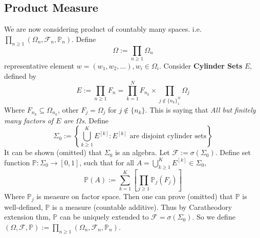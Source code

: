 \documentclass[a4paper,12pt,twoside]{book}
\begin{document}
\subsection{Product Measure}
We are now considering product of countably many spaces. i.e. $\prod_{n\geq 1}(\Omega_n, \mathcal{F}_n, \mathbb{P}_n)$.\newline
Define 
$$\Omega:=\prod_{n\geq 1}\Omega_n$$
representative element $w = (w_1, w_2,...), w_i \in \Omega_i$.\newline
Consider \textbf{Cylinder Sets} $E$, defined by
\begin{equation}
	E:=\prod_{n\geq 1}F_n= \prod_{k=1}^N F_{n_k} \times \prod_{j\notin\{n_k\}_1^N}\Omega_j
\end{equation}
Where $F_{n_k}\subseteq \Omega_{n_k}$, other $F_j=\Omega_j$ for $j\notin\{n_k\}$. This is saying that \textit{All but finitely many factors of $E$ are $\Omega$s}. \newline
Define
\begin{equation}
	\Sigma_0:=\left\{\bigcup_{k\geq 1}^K E^{[k]}: E^{[k]} \text{ are disjoint cylinder sets}\right\}
\end{equation}
It can be shown (omitted) that $\Sigma_0$ is an algebra. Let $\mathcal{F}:=\sigma(\Sigma_0)$. \newline
Define set function $\mathbb{P}: \Sigma_0\to [0,1]$, such that for all $A=\bigcup_{k\geq 1}^K E^{[k]}\in \Sigma_0$,
\begin{equation}
	\mathbb{P}\left(A\right):=\sum_{k=1}^K \left[\prod_{j\geq 1} \mathbb{P}_j\left(F_j\right)\right]
\end{equation}
Where $\mathbb{P}_j$ is measure on factor space. Then one can prove (omitted) that $\mathbb{P}$ is well-defined, $\mathbb{P}$ is a measure (countable additive).\newline
Thus by Caratheodory extension thm, $\mathbb{P}$ can be uniquely extended to $\mathcal{F}=\sigma(\Sigma_0)$. \newline
So we define $(\Omega, \mathcal{F}, \mathbb{P}):=\prod_{n\geq 1}(\Omega_n, \mathcal{F}_n, \mathbb{P}_n)$.

\end{document}
